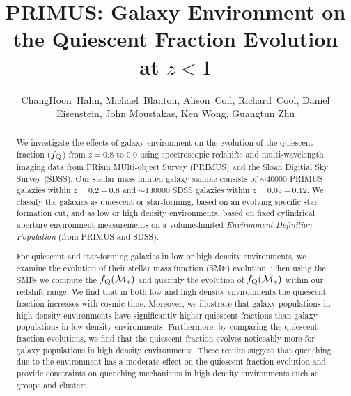 \documentclass{emulateapj}
\begin{document}
\title{PRIMUS: Galaxy Environment on the Quiescent Fraction Evolution at $z < 1$}
\author{
ChangHoon~Hahn, 
Michael~Blanton, 
Alison~Coil, 
Richard~Cool, 
Daniel Eisenstein,
John Moustakas, 
Ken Wong, 
Guangtun Zhu
}
\begin{abstract}
We investigate the effects of galaxy environment on the evolution of the quiescent fraction ($f_{\rm{Q}}$) from $z =0.8 $ to $ 0.0$ using spectroscopic redshifts and multi-wavelength imaging data from PRism MUlti-object Survey (PRIMUS) and the Sloan Digitial Sky Survey (SDSS). Our stellar mass limited galaxy sample consists of $\sim 40000$ PRIMUS galaxies within $z = 0.2-0.8$ and $\sim 130000$ SDSS galaxies within $z = 0.05-0.12$. We classify the galaxies as quiescent or star-forming, based on an evolving specific star formation cut, and as low or high density environments, based on fixed cylindrical aperture environment measurements on a volume-limited {\em Environment Definition Population} (from PRIMUS and SDSS). 

For quiescent and star-forming galaxies in low or high density environments, we examine the evolution of their stellar mass function (SMF) evolution. Then using the SMFs we compute the $f_{\rm{Q}}(\mathcal{M}_{*})$ and quantify the evolution of $f_{\rm{Q}}(\mathcal{M}_{*})$ within our redshift range. We find that in both low and high density environments the quiescent fraction increases with cosmic time. Moreover, we illustrate that galaxy populations in high density environments have significantly higher quiescent fractions than galaxy populations in low density environments. Furthermore, by comparing the quiescent fraction evolutions, we find that the quiescent fraction evolves noticeably more for galaxy populations in high density environments. These results suggest that quenching due to the environment has a moderate effect on the quiescent fraction evolution and provide constraints on quenching mechanisms in high density environments such as groups and clusters. 
\end{abstract}
\end{document}
